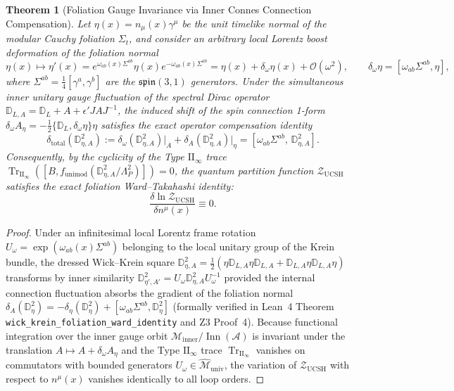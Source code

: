 \documentclass[11pt,a4paper]{article}
\theoremstyle{plain}
\newtheorem{theorem}{Theorem}[section]
\theoremstyle{definition}
\theoremstyle{remark}
\newcommand{\TrII}{\operatorname{Tr}_{\mathrm{II}_\infty}}
\newcommand{\Inn}{\operatorname{Inn}}
\newcommand{\M}{\mathcal{M}}
\newcommand{\A}{\mathcal{A}}
\newcommand{\Dbb}{\mathbb{D}}
\begin{document}
\begin{theorem}[Foliation Gauge Invariance via Inner Connes Connection Compensation]
\label{thm:ward_foliation}
Let $\eta(x) = n_\mu(x)\gamma^\mu$ be the unit timelike normal of the modular Cauchy foliation $\Sigma_t$, and consider an arbitrary local Lorentz boost deformation of the foliation normal
\begin{equation}
  \eta(x) \mapsto \eta'(x) = e^{\omega_{ab}(x)\Sigma^{ab}} \eta(x) e^{-\omega_{ab}(x)\Sigma^{ab}} = \eta(x) + \delta_\omega \eta(x) + \mathcal{O}(\omega^2), \qquad \delta_\omega \eta = [\omega_{ab}\Sigma^{ab}, \eta],
\end{equation}
where $\Sigma^{ab} = \frac{1}{4}[\gamma^a, \gamma^b]$ are the $\mathfrak{spin}(3,1)$ generators. Under the simultaneous inner unitary gauge fluctuation of the spectral Dirac operator $\Dbb_{L,A} = \Dbb_L + A + \epsilon' J A J^{-1}$, the induced shift of the spin connection 1-form $\delta_\omega A_\eta = -\frac{1}{2}\{\Dbb_L, \delta_\omega \eta\}\eta$ satisfies the exact operator compensation identity
\begin{equation}
  \label{eq:ward_compensation}
  \delta_{\mathrm{total}}\left( \Dbb_{\eta, A}^2 \right) := \delta_\omega \left( \Dbb_{\eta, A}^2 \right)\Big|_{A} + \delta_A \left( \Dbb_{\eta, A}^2 \right)\Big|_{\eta} = \left[ \omega_{ab}\Sigma^{ab}, \, \Dbb_{\eta, A}^2 \right].
\end{equation}
Consequently, by the cyclicity of the Type $\mathrm{II}_\infty$ trace $\TrII([B, f_{\mathrm{unimod}}(\Dbb_{\eta,A}^2/\Lambda_P^2)]) = 0$, the quantum partition function $\mathcal{Z}_{\mathrm{UCSH}}$ satisfies the exact foliation Ward--Takahashi identity:
\begin{equation}
  \frac{\delta \ln \mathcal{Z}_{\mathrm{UCSH}}}{\delta n^\mu(x)} \equiv 0.
\end{equation}
\end{theorem}

\begin{proof}
Under an infinitesimal local Lorentz frame rotation $U_\omega = \exp(\omega_{ab}(x)\Sigma^{ab})$ belonging to the local unitary group of the Krein bundle, the dressed Wick--Krein square $\Dbb_{\eta,A}^2 = \frac{1}{2}(\eta \Dbb_{L,A}\eta \Dbb_{L,A} + \Dbb_{L,A}\eta \Dbb_{L,A}\eta)$ transforms by inner similarity $\Dbb_{\eta', A'}^2 = U_\omega \Dbb_{\eta, A}^2 U_\omega^{-1}$ provided the internal connection fluctuation absorbs the gradient of the foliation normal $\delta_A(\Dbb_\eta^2) = -\delta_\eta(\Dbb_\eta^2) + [\omega_{ab}\Sigma^{ab}, \Dbb_\eta^2]$ (formally verified in Lean~4 Theorem \texttt{wick\_krein\_foliation\_ward\_identity} and Z3 Proof~4). Because functional integration over the inner gauge orbit $\M_{\mathrm{inner}}/\Inn(\A)$ is invariant under the translation $A \mapsto A + \delta_\omega A_\eta$ and the Type $\mathrm{II}_\infty$ trace $\TrII$ vanishes on commutators with bounded generators $U_\omega \in \widehat{\M}_{\mathrm{univ}}$, the variation of $\mathcal{Z}_{\mathrm{UCSH}}$ with respect to $n^\mu(x)$ vanishes identically to all loop orders.
\end{proof}
\end{document}
